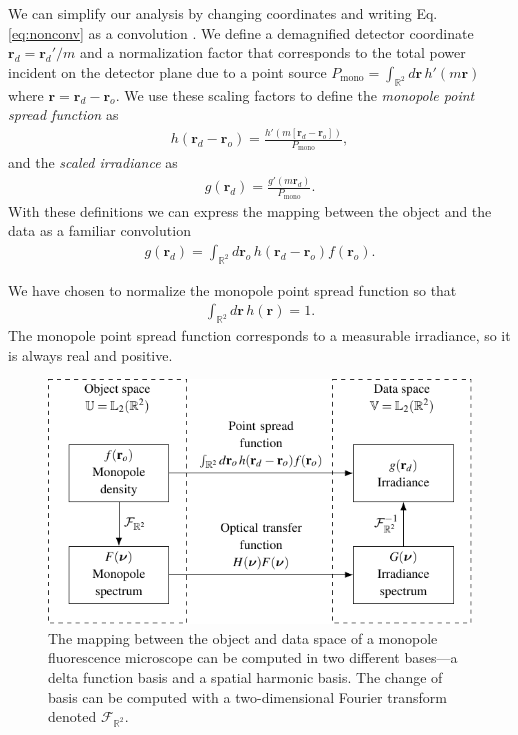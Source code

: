 \documentclass[]{osa-article}
\providecommand{\mb}[1]{\mathbf{#1}}
\providecommand{\ro}{\mathbf{\mathbf{r}}_o}
\providecommand{\rd}{\mathbf{r}_d}
\providecommand{\mbb}[1]{\mathbb{#1}}
\begin{document}
We can simplify our analysis by changing coordinates and writing Eq.
\eqref{eq:nonconv} as a convolution \cite[ch.~7.2.7]{barrett2004}. We
define a demagnified detector coordinate $\rd = \rd'/m$ and a normalization
factor that corresponds to the total power incident on the detector plane due to
a point source $P_{\text{mono}} = \int_{\mbb{R}^2}d\mb{r}\,h'(m\mb{r})$ where
$\mb{r} = \rd - \ro$. We use these scaling factors to define the
\textit{monopole point spread function} as
\begin{align}
  h(\rd - \ro) = \frac{h'(m[\rd - \ro])}{P_{\text{mono}}},
\end{align}
and the \textit{scaled irradiance} as
\begin{align}
  g(\rd) = \frac{g'(m\rd)}{P_{\text{mono}}}.
\end{align}
With these definitions we can express the mapping between the object and the
data as a familiar convolution
\begin{align}
  g(\rd) = \int_{\mbb{R}^2}d\ro\, h(\rd - \ro)f(\ro).  \label{eq:lsi}
\end{align}

We have chosen to normalize the monopole point spread function so that
\begin{align}
  \int_{\mbb{R}^2}d\mb{r}\, h(\mb{r}) = 1. \label{eq:norm}
\end{align}
The monopole point spread function corresponds to a measurable irradiance, so it
is always real and positive.

\begin{figure}
  \centering
  \includegraphics[scale=1.0]{../figures/monopole-block/monopole-block.pdf}
  \caption{The mapping between the object and data space of a monopole
    fluorescence microscope can be computed in two different bases---a delta
    function basis and a spatial harmonic basis. The change of basis can be
    computed with a two-dimensional Fourier transform denoted
    $\mathcal{F}_{\mbb{R}^2}$.}
     \label{fig:monopole-block}      
\end{figure}
\end{document}
